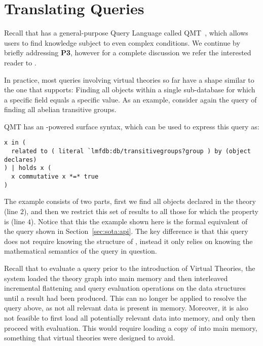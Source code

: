 \section{Translating Queries}\label{sec:qmt}

Recall that \mmt has a general-purpose Query Language called QMT~\cite{Rabe:qlfml12}, which allows users to find knowledge subject to even complex conditions. 
We continue by briefly addressing \textbf{P3}, however for a complete discussion we refer the interested reader to \cite{twiesing:msc17}. 

In practice, most queries involving virtual theories so far have a shape similar to the one that \lmfdb supports: 
Finding all objects within a single sub-database for which a specific field equals a specific value. 
As an example, consider again the query of finding all abelian transitive groups. 
 
QMT has an \mmt-powered surface syntax, which can be used to express this query as:
\begin{lstlisting}[language=qmt]
x in (
  related to ( literal `lmfdb:db/transitivegroups?group ) by (object declares)
) | holds x (
  x commutative x *=* true
)
\end{lstlisting}

The example consists of two parts, first we find all objects declared in the  theory (line $2$), and then we restrict this set of results to all those for which the  property is  (line $4$). 
Notice that this the example shown here is the formal equivalent of the \lmfdb query shown in Section~\ref{sec:sota:api}. 
The key difference is that this query does not require knowing the structure of \lmfdb, instead it only relies on knowing the mathematical semantics of the query in question. 

Recall that to evaluate a query prior to the introduction of Virtual Theories, the \mmt system loaded the theory graph into main memory and then interleaved incremental flattening and query evaluation operations on the \mmt data structures until a result had been produced. 
This can no longer be applied to resolve the query above, as not all relevant data is present in memory. 
Moreover, it is also not feasible to first load all potentially relevant data into memory, and only then proceed with evaluation. 
This would require loading a copy of \lmfdb into main memory, something that virtual theories were designed to avoid. 

